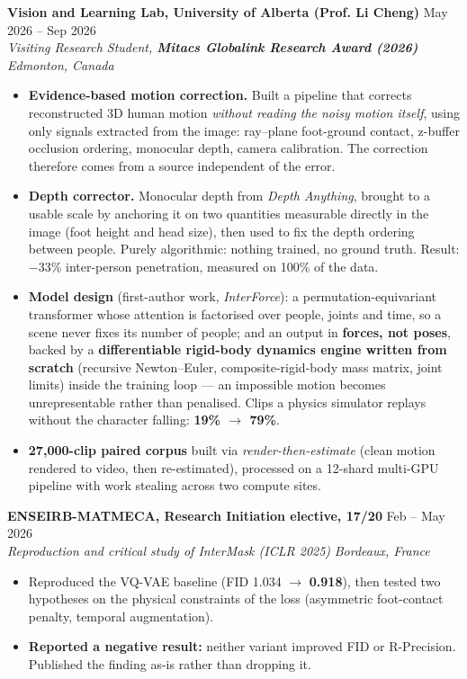 \documentclass[10pt, letterpaper]{article}
\newcommand{\entry}[4]{%
  \noindent \textbf{#1} \hfill #2 \\
  \textit{#3} \hfill \textit{#4} \par
}
\begin{document}
\entry{Vision and Learning Lab, University of Alberta (Prof. Li Cheng)}{May 2026 -- Sep 2026}%
{Visiting Research Student, \textbf{Mitacs Globalink Research Award (2026)}}{Edmonton, Canada}
\begin{itemize}
    \item \textbf{Evidence-based motion correction.} Built a pipeline that corrects reconstructed 3D human motion \textit{without reading the noisy motion itself}, using only signals extracted from the image: ray--plane foot-ground contact, z-buffer occlusion ordering, monocular depth, camera calibration. The correction therefore comes from a source independent of the error.
    \item \textbf{Depth corrector.} Monocular depth from \textit{Depth Anything}, brought to a usable scale by anchoring it on two quantities measurable directly in the image (foot height and head size), then used to fix the depth ordering between people. Purely algorithmic: nothing trained, no ground truth. Result: $-$33\% inter-person penetration, measured on 100\% of the data.
    \item \textbf{Model design} (first-author work, \textit{InterForce}): a permutation-equivariant transformer whose attention is factorised over people, joints and time, so a scene never fixes its number of people; and an output in \textbf{forces, not poses}, backed by a \textbf{differentiable rigid-body dynamics engine written from scratch} (recursive Newton--Euler, composite-rigid-body mass matrix, joint limits) inside the training loop --- an impossible motion becomes unrepresentable rather than penalised. Clips a physics simulator replays without the character falling: \textbf{19\% $\to$ 79\%}.
    \item \textbf{27{,}000-clip paired corpus} built via \textit{render-then-estimate} (clean motion rendered to video, then re-estimated), processed on a 12-shard multi-GPU pipeline with work stealing across two compute sites.
\end{itemize}

\vspace{4pt}

\entry{ENSEIRB-MATMECA, Research Initiation elective, 17/20}{Feb -- May 2026}%
{Reproduction and critical study of \textit{InterMask} (ICLR 2025)}{Bordeaux, France}
\begin{itemize}
    \item Reproduced the VQ-VAE baseline (FID 1.034 $\to$ \textbf{0.918}), then tested two hypotheses on the physical constraints of the loss (asymmetric foot-contact penalty, temporal augmentation).
    \item \textbf{Reported a negative result:} neither variant improved FID or R-Precision. Published the finding as-is rather than dropping it.
\end{itemize}
\end{document}

